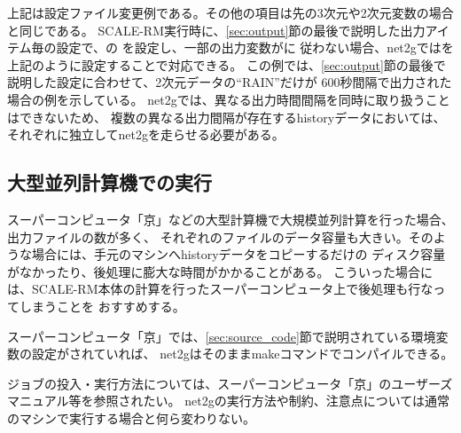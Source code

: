 \noindent 上記は設定ファイル変更例である。その他の項目は先の3次元や2次元変数の場合と同じである。
SCALE-RM実行時に、\ref{sec:output}節の最後で説明した出力アイテム毎の設定で、の
を設定し、一部の出力変数がに
従わない場合、net2gではを上記のように設定することで対応できる。
この例では、\ref{sec:output}節の最後で説明した設定に合わせて、2次元データの``RAIN''だけが
600秒間隔で出力された場合の例を示している。
net2gでは、異なる出力時間間隔を同時に取り扱うことはできないため、
複数の異なる出力間隔が存在するhistoryデータにおいては、それぞれに独立してnet2gを走らせる必要がある。


\subsection{大型並列計算機での実行} \label{subsec:on_supercom}

スーパーコンピュータ「京」などの大型計算機で大規模並列計算を行った場合、出力ファイルの数が多く、
それぞれのファイルのデータ容量も大きい。そのような場合には、手元のマシンへhistoryデータをコピーするだけの
ディスク容量がなかったり、後処理に膨大な時間がかかることがある。
こういった場合には、SCALE-RM本体の計算を行ったスーパーコンピュータ上で後処理も行なってしまうことを
おすすめする。

スーパーコンピュータ「京」では、\ref{sec:source_code}節で説明されている環境変数の設定がされていれば、
net2gはそのままmakeコマンドでコンパイルできる。

ジョブの投入・実行方法については、スーパーコンピュータ「京」のユーザーズマニュアル等を参照されたい。
net2gの実行方法や制約、注意点については通常のマシンで実行する場合と何ら変わりない。



